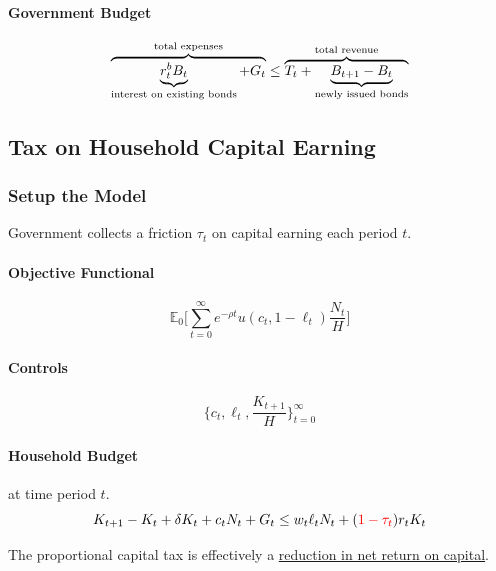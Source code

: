 \documentclass[11pt]{article}
\newcommand{\expat}[2]{\mathbb{E}_{#1}\Big[{#2}\Big]}
\begin{document}
				\paragraph{Government Budget}
					\begin{equation}
						\overbrace{\underbrace{r^b_t B_t}_{\text{{interest on existing bonds}}} + G_t}^{\text{{total expenses}}} \leq \overbrace{T_t + \underbrace{B_{t+1} - B_t}_{\text{{newly issued bonds}}}}^{\text{{total revenue}}}
					\end{equation}
		
		\subsection{Tax on Household Capital Earning}
			\subsubsection{Setup the Model}
			\begin{assumption}
				Government collects a friction $\tau_t$ on capital earning each period $t$.
			\end{assumption}
			\paragraph{Objective Functional}
				\begin{equation}
					\expat{0}{\sum_{t=0}^\infty e^{-\rho t} u(c_t, 1 - \ell_t) \frac{N_t}{H}}
				\end{equation}
				
			\paragraph{Controls}
				\begin{equation}
					\{c_t, \ell_t, \frac{K_{t+1}}{H}\}_{t=0}^\infty
				\end{equation}
			
			\paragraph{Household Budget} at time period $t$.
				\begin{equation}
					K_{t+1} - K_t + \delta K_t + c_t N_t + G_t \leq w_t \ell_t N_t + (\textcolor{red}{1-\tau_t})r_t K_t	
				\end{equation}
			
			\begin{remark}
				The proportional capital tax is effectively a \ul{reduction in net return on capital}.
			\end{remark}	
			
\end{document}
